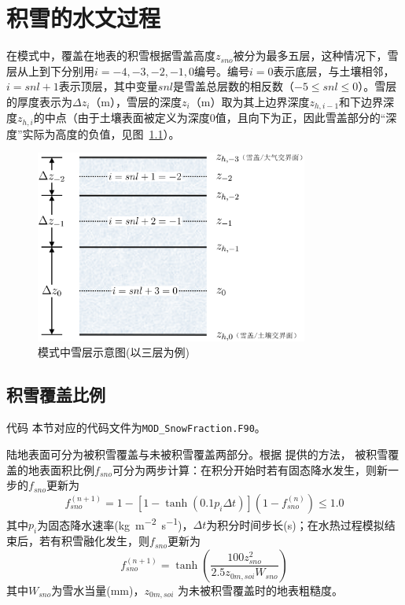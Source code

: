 \chapter{积雪的水文过程}
在模式中，覆盖在地表的积雪根据雪盖高度$z_{sno}$被分为最多五层，这种情况下，雪层从上到下分别用$i = −4, −3, −2, −1, 0$编号。编号$i = 0$表示底层，与土壤相邻，$i = snl + 1$表示顶层，其中变量$snl$是雪盖总层数的相反数（$-5\leqslant snl\leqslant 0$）。雪层的厚度表示为$\Delta z_i$（m），雪层的深度$z_i$（m）取为其上边界深度$z_{h,i-1}$和下边界深度$z_{h,i}$的中点（由于土壤表面被定义为深度0值，且向下为正，因此雪盖部分的“深度”实际为高度的负值，见图~\ref{fig:模式中积雪雪层示意图}）。
{
\begin{figure}[htbp]
\centering
\includegraphics[width=0.8\textwidth]{Figures/雪盖土壤热力过程/模式中积雪雪层示意图.png}
\caption{模式中雪层示意图(以三层为例)}
\label{fig:模式中积雪雪层示意图}
\end{figure}
}
\section{积雪覆盖比例}
\begin{mymdframed}{代码}
    本节对应的代码文件为\texttt{MOD\_SnowFraction.F90}。
\end{mymdframed}

陆地表面可分为被积雪覆盖与未被积雪覆盖两部分。根据 \citet{swenson2012new}提供的方法，
被积雪覆盖的地表面积比例$f_{sno}$可分为两步计算：在积分开始时若有固态降水发生，则新一步的$f_{sno}$更新为
\begin{equation}
f_{{sno }}^{(n+1)}=1-\left[1-\tanh\left(0.1 p_{i} \Delta t\right)\right]\left(1-f_{{sno }}^{(n)}\right) \leqslant 1.0
\end{equation}
其中$p_i$为固态降水速率(\unit{kg.m^{-2}.s^{-1}})，$\Delta t$为积分时间步长(s)；在水热过程模拟结束后，若有积雪融化发生，则$f_{sno}$更新为
\begin{equation}
f_{sno}^{(n+1)}=\tanh{\left(\frac{100 z_{s n o}^{2}}{2.5 z_{0 m, s o i} W_{sno}}\right)}
\end{equation}
其中$W_{sno}$为雪水当量(mm)，$z_{0m,soi}$ 为未被积雪覆盖时的地表粗糙度。

